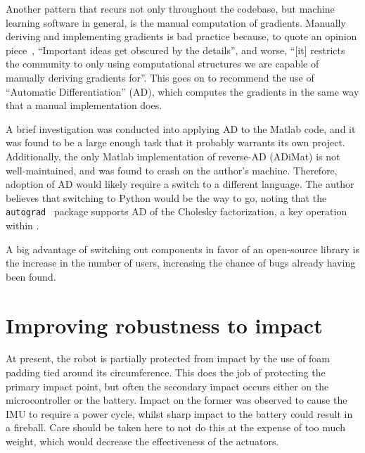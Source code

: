 \documentclass[main.tex]{subfiles}
\begin{document}
	Another pattern that recurs not only throughout the {\Pilco} codebase, but machine learning software in general, is the manual computation of gradients.
	Manually deriving and implementing gradients is bad practice because, to quote an opinion piece~\cite{ad-criminal}, \enquote{Important ideas get obscured by the details}, and worse, \enquote{[it] restricts the community to only using computational structures we are capable of manually deriving gradients for}.
	This goes on to recommend the use of \enquote{Automatic Differentiation} (AD), which computes the gradients in the same way that a manual implementation does.

	A brief investigation was conducted into applying AD to the Matlab {\Pilco} code, and it was found to be a large enough task that it probably warrants its own project. Additionally, the only Matlab implementation of reverse-AD (ADiMat) is not well-maintained, and was found to crash on the author's machine.
	Therefore, adoption of AD would likely require a switch to a different language.
	The author believes that switching to Python would be the way to go\footnotemark, noting that the \texttt{autograd}~\cite{autograd} package supports AD of the Cholesky factorization, a key operation within {\Pilco}.

	A big advantage of switching out components in favor of an open-source library is the increase in the number of users, increasing the chance of bugs already having been found.


\section{Improving robustness to impact}

	At present, the robot is partially protected from impact by the use of foam padding tied around its circumference.
	This does the job of protecting the primary impact point, but often the secondary impact occurs either on the microcontroller or the battery. Impact on the former was observed to cause the IMU to require a power cycle, whilst sharp impact to the battery could result in a fireball.
	Care should be taken here to not do this at the expense of too much weight, which would decrease the effectiveness of the actuators. 
\end{document}
